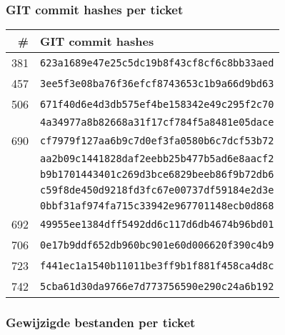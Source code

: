 
\subsubsection{GIT commit hashes per ticket} %
\label{ssub:git_commit_hashes_per_ticket}

\begin{tabular}{ r | p{15cm} } \hline
  \textbf{\#} & \textbf{GIT commit hashes} \\ \hline
  381 & \texttt{623a1689e47e25c5dc19b8f43cf8cf6c8bb33aed} \\ \hline
  457 & \texttt{3ee5f3e08ba76f36efcf8743653c1b9a66d9bd63} \\ \hline
  506 & \texttt{671f40d6e4d3db575ef4be158342e49c295f2c70} \\
      & \texttt{4a34977a8b82668a31f17cf784f5a8481e05dace} \\ \hline
  690 & \texttt{cf7979f127aa6b9c7d0ef3fa0580b6c7dcf53b72} \\
      & \texttt{aa2b09c1441828daf2eebb25b477b5ad6e8aacf2} \\
      & \texttt{b9b1701443401c269d3bce6829beeb86f9b72db6} \\
      & \texttt{c59f8de450d9218fd3fc67e00737df59184e2d3e} \\
      & \texttt{0bbf31af974fa715c33942e967701148ecb0d868} \\ \hline
  692 & \texttt{49955ee1384dff5492dd6c117d6db4674b96bd01} \\ \hline
  706 & \texttt{0e17b9ddf652db960bc901e60d006620f390c4b9} \\ \hline
  723 & \texttt{f441ec1a1540b11011be3ff9b1f881f458ca4d8c} \\ \hline
  742 & \texttt{5cba61d30da9766e7d773756590e290c24a6b192} \\ \hline
\end{tabular}


\subsubsection{Gewijzigde bestanden per ticket} %
\label{ssub:gewijzigde_bestanden_per_ticket}

